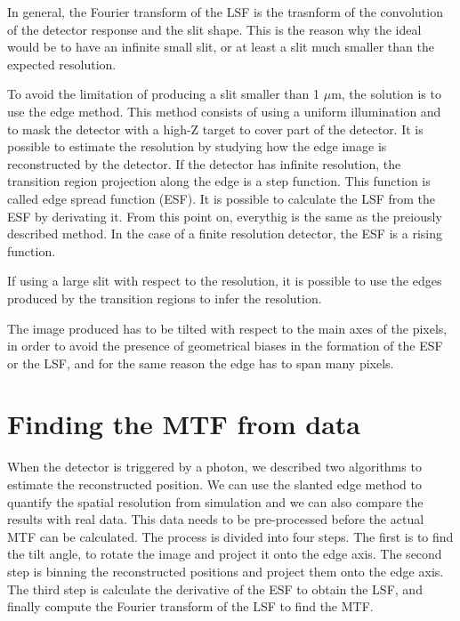In general, the Fourier transform of the LSF is the trasnform of the convolution of the detector response and the slit shape. This is the reason why the ideal would be to have an infinite small slit, or at least a slit much smaller than the expected resolution.

To avoid the limitation of producing a slit smaller than 1 $\mu$m, the solution is to use the edge method. This method consists of using a uniform illumination and to mask the detector with a high-Z target to cover part of the detector. It is possible to estimate the resolution by studying how the edge image is reconstructed by the detector. If the detector has infinite resolution, the transition region projection along the edge is a step function. This function is called edge spread function (ESF). It is possible to calculate the LSF from the ESF by derivating it. From this point on, everythig is the same as the preiously described method. In the case of a finite resolution detector, the ESF is a rising function.

If using a large slit with respect to the resolution, it is possible to use the edges produced by the transition regions to infer the resolution.

The image produced has to be tilted with respect to the main axes of the pixels, in order to avoid the presence of geometrical biases in the formation of the ESF or the LSF, and for the same reason the edge has to span many pixels.



\section{Finding the MTF from data}
When the detector is triggered by a photon, we described two algorithms to estimate the reconstructed position. We can use the slanted edge method to quantify the spatial resolution from simulation and we can also compare the results with real data. This data needs to be pre-processed before the actual MTF can be calculated. The process is divided into four steps. The first is to find the tilt angle, to rotate the image and project it onto the edge axis. The second step is binning the reconstructed positions and project them onto the edge axis. The third step is calculate the derivative of the ESF to obtain the LSF, and finally compute the Fourier transform of the LSF to find the MTF.

